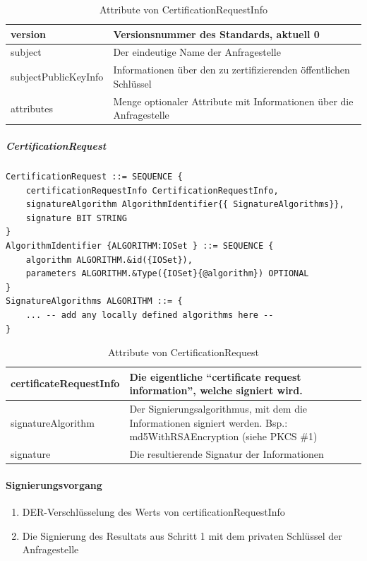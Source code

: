 \documentclass[10pt,a4paper]{article}
\begin{document}
\begin{table}[ht]
    \centering
    \begin{tabular}{|l|p{7.2cm}|} \hline
        version & Versionsnummer des Standards, aktuell 0 \\\hline
        subject & Der eindeutige Name der Anfragestelle \\\hline
        subjectPublicKeyInfo & Informationen über den zu zertifizierenden öffentlichen
            Schlüssel \\\hline
        attributes & Menge optionaler Attribute mit Informationen über die Anfragestelle
            \\\hline
    \end{tabular}
    \caption{Attribute von CertificationRequestInfo}
    \label{tab:cert-request-info-attribs}
\end{table}

\subparagraph{CertificationRequest}
\begin{verbatim}
CertificationRequest ::= SEQUENCE {
    certificationRequestInfo CertificationRequestInfo,
    signatureAlgorithm AlgorithmIdentifier{{ SignatureAlgorithms}},
    signature BIT STRING
}
AlgorithmIdentifier {ALGORITHM:IOSet } ::= SEQUENCE {
    algorithm ALGORITHM.&id({IOSet}),
    parameters ALGORITHM.&Type({IOSet}{@algorithm}) OPTIONAL
}
SignatureAlgorithms ALGORITHM ::= {
    ... -- add any locally defined algorithms here --
}
\end{verbatim}

\begin{table}[ht]
    \centering
    \begin{tabular}{|l|p{7.2cm}|} \hline
        certificateRequestInfo & Die eigentliche "`certificate request information"',
            welche signiert wird. \\\hline
        signatureAlgorithm & Der Signierungsalgorithmus, mit dem die Informationen
            signiert werden. Bsp.: md5WithRSAEncryption (siehe PKCS \#1) \\\hline
        signature & Die resultierende Signatur der Informationen \\\hline
    \end{tabular}
    \caption{Attribute von CertificationRequest}
    \label{tab:cert-req-attribs}
\end{table}

\paragraph{Signierungsvorgang}
\begin{enumerate}
    \item DER-Verschlüsselung des Werts von certificationRequestInfo
    \item Die Signierung des Resultats aus Schritt 1 mit dem privaten Schlüssel der
        Anfragestelle
\end{enumerate}
\end{document}
